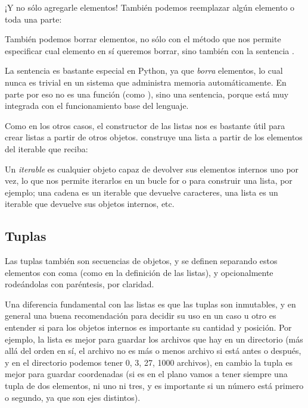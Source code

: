 
¡Y no sólo agregarle elementos! También podemos reemplazar algún elemento o toda una parte:


También podemos borrar elementos, no sólo con el método que nos permite especificar cual elemento en sí queremos borrar, sino también con la sentencia .


\begin{info}
La sentencia  es bastante especial en Python, ya que \textit{borra} elementos, lo cual nunca es trivial en un sistema que administra memoria automáticamente. En parte por eso no es una función (como ), sino una sentencia, porque está muy integrada con el funcionamiento base del lenguaje.
\end{info}

Como en los otros casos, el constructor de las listas nos es bastante útil para crear listas a partir de otros objetos.  construye una lista a partir de los elementos del iterable que reciba:


\begin{info}
Un \textit{iterable} es cualquier objeto capaz de devolver sus elementos internos uno por vez, lo que nos permite iterarlos en un bucle for o para construir una lista, por ejemplo; una cadena es un iterable que devuelve caracteres, una lista es un iterable que devuelve sus objetos internos, etc.
\end{info}


\subsection{Tuplas}\label{sub:tuplas}

Las tuplas también son secuencias de objetos, y se definen separando estos elementos con coma (como en la definición de las listas), y opcionalmente rodeándolas con paréntesis, por claridad.


Una diferencia fundamental con las listas es que las tuplas son inmutables, y en general una buena recomendación para decidir su uso en un caso u otro es entender si para los objetos internos es importante su cantidad y posición. Por ejemplo, la lista es mejor para guardar los archivos que hay en un directorio (más allá del orden en sí, el archivo no es más o menos archivo si está antes o después, y en el directorio podemos tener 0, 3, 27, 1000 archivos), en cambio la tupla es mejor para guardar coordenadas (si es en el plano vamos a tener siempre una tupla de dos elementos, ni uno ni tres, y es importante si un número está primero o segundo, ya que son ejes distintos).

